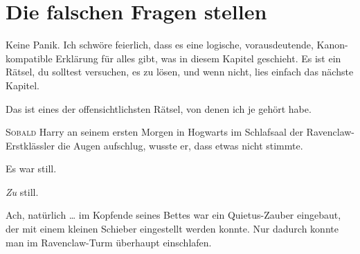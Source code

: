 \chapter{Die falschen Fragen stellen}

\begin{chapterOpeningAuthorNote}
%
Keine Panik. Ich schwöre feierlich, dass es eine logische, vorausdeutende, Kanon-kompatible Erklärung für alles gibt, was in diesem Kapitel geschieht. Es ist ein Rätsel, du solltest versuchen, es zu lösen, und wenn nicht, lies einfach das nächste Kapitel.
\end{chapterOpeningAuthorNote}
\begin{chapterOpeningQuote}
Das ist eines der offensichtlichsten Rätsel, von denen ich je gehört habe.
\end{chapterOpeningQuote}



\lettrine{S}{obald} Harry an seinem ersten Morgen in Hogwarts im Schlafsaal der Ravenclaw-Erstklässler die Augen aufschlug, wusste er, dass etwas nicht stimmte.

Es war still.

\emph{Zu} still.

Ach, natürlich … im Kopfende seines Bettes war ein Quietus-Zauber eingebaut, der mit einem kleinen Schieber eingestellt werden konnte. Nur dadurch konnte man im Ravenclaw-Turm überhaupt einschlafen.

